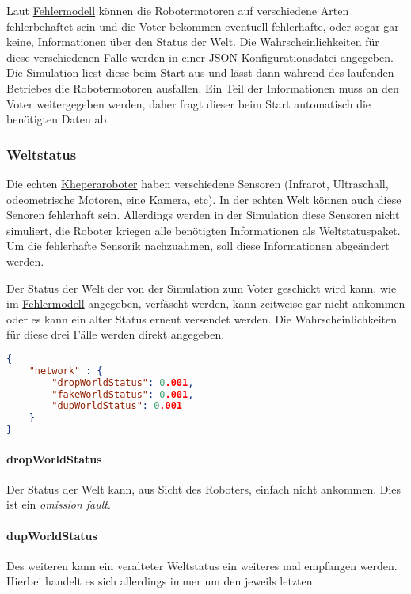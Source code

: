 Laut \hyperref[fm]{Fehlermodell} k{\"{o}}nnen die Robotermotoren auf verschiedene Arten fehlerbehaftet
sein und die Voter bekommen eventuell fehlerhafte, oder sogar gar keine, Informationen {\"{u}}ber
den Status der Welt. Die Wahrscheinlichkeiten f{\"{u}}r diese verschiedenen F{\"{a}}lle
werden in einer JSON Konfigurationsdatei angegeben. Die Simulation liest diese beim Start aus und 
l{\"{a}}sst dann w{\"{a}}hrend des laufenden Betriebes die Robotermotoren ausfallen.
Ein Teil der Informationen muss an den Voter weitergegeben werden, daher fragt dieser beim Start
automatisch die ben{\"{o}}tigten Daten ab.


\subsubsection{Weltstatus}
Die echten \hyperref[khepera]{Kheperaroboter} haben verschiedene Sensoren (Infrarot, Ultraschall,
odeometrische Motoren, eine Kamera, etc). In der echten Welt k{\"{o}}nnen auch diese Senoren fehlerhaft
sein. Allerdings werden in der Simulation diese Sensoren nicht simuliert, die Roboter kriegen alle
ben{\"{o}}tigten Informationen als Weltstatuspaket. Um die fehlerhafte Sensorik nachzuahmen, soll diese
Informationen abge{\"{a}}ndert werden.

Der Status der Welt der von der Simulation zum Voter geschickt wird kann, wie im \hyperref[fm]{Fehlermodell} angegeben, verf{\"{a}}scht werden, kann zeitweise gar
nicht ankommen oder es kann ein alter Status erneut versendet werden. Die Wahrscheinlichkeiten f{\"{u}}r diese drei F{\"{a}}lle werden direkt angegeben.
\begin{lstlisting}[frame=single, language=json] 
{
	"network" : {
		"dropWorldStatus": 0.001,
		"fakeWorldStatus": 0.001,
		"dupWorldStatus": 0.001
	}
}
\end{lstlisting}

\paragraph{dropWorldStatus} Der Status der Welt kann, aus Sicht des Roboters, einfach nicht ankommen. Dies
	ist ein \textit{omission fault}.
\paragraph{dupWorldStatus} Des weiteren kann ein veralteter Weltstatus ein weiteres mal empfangen werden.
    Hierbei handelt es sich allerdings immer um den jeweils letzten.
